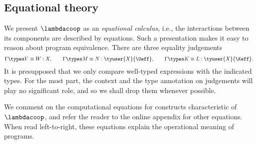 
\subsection{Equational theory}
\label{sect:eqtheory}

We present $\lambdacoop$ as an \emph{equational calculus}, i.e., the interactions between
its components are described by equations. Such a presentation makes it easy to reason
about program equivalence.
%
There are three equality judgements
%
\begin{equation*}
\Gamma \types V \equiv W : X, 
\qquad
\Gamma \types M \equiv N : \tyuser{X}{\Ueff}, 
\qquad
\Gamma \types K \equiv L  : \tyuser{X}{\Keff}.
\end{equation*}
%
It is presupposed that we only compare well-typed expressions with the indicated types.
For the most part, the context and the type annotation on judgements will play no significant role,
and so we shall drop them whenever possible.

We comment on the computational equations for constructs characteristic
of~$\lambdacoop$, and refer the reader to the online appendix for other equations.
%
When read left-to-right, these equations explain the operational meaning of programs.


